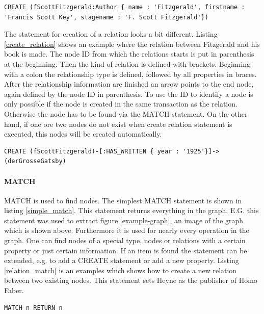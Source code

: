 \begin{lstlisting}[language={Cypher}, caption={Create Node}, label={create_node}]
CREATE (fScottFitzgerald:Author { name : 'Fitzgerald', firstname : 'Francis Scott Key', stagename : 'F. Scott Fitzgerald'})
\end{lstlisting}

The statement for creation of a relation looks a bit different. Listing \ref{create_relation} shows an example where the relation between Fitzgerald and his book is made. The node ID from which the relations starts is put in parenthesis at the beginning. Then the kind of relation is defined with brackets. Beginning with a colon the relationship type is defined, followed by all properties in braces. After the relationship information are finished an arrow points to the end node, again defined by the node ID in parenthesis. To use the ID to identify a node is only possible if the node is created in the same transaction as the relation. Otherwise the node has to be found via the MATCH statement. On the other hand, if one ore two nodes do not exist when create relation statement is executed, this nodes will be created automatically. 

\begin{lstlisting}[language={Cypher}, caption={Create Relation}, label={create_relation}]
CREATE (fScottFitzgerald)-[:HAS_WRITTEN { year : '1925'}]->(derGrosseGatsby)
\end{lstlisting}

\paragraph{MATCH}
MATCH is used to find nodes. The simplest MATCH statement is shown in listing \ref{simple_match}. This statement returns everything in the graph. E.G. this statement was used to extract figure \ref{example-graph}, an image of the graph which is shown above. Furthermore it is used for nearly every operation in the graph. One can find nodes of a special type, nodes or relations with a certain property or just certain information. If an item is found the statement can be extended, e.g. to add a CREATE statement or add a new property. Listing \ref{relation_match} is an examples which shows how to create a new relation between two existing nodes. This statement sets Heyne as the publisher of Homo Faber.

\begin{lstlisting}[language={Cypher}, caption={Simplest Match Statement}, label={simple_match}]
MATCH n RETURN n
\end{lstlisting}

